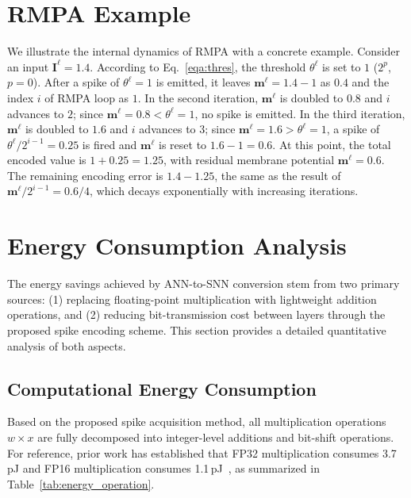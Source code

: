 \section{RMPA Example}\label{sec:rmpa_example}
We illustrate the internal dynamics of RMPA with a concrete example. Consider an input $\mathbf{I}^\ell = 1.4$. According to Eq.~\eqref{eqa:thres}, the threshold $\theta^\ell$ is set to $1$ ($2^{p}$, $p=0$). After a spike of $\theta^\ell=1$ is emitted, it leaves $\mathbf{m}^\ell=1.4-1$ as $0.4$ and the index $i$ of RMPA loop as $1$. In the second iteration, $\mathbf{m}^\ell$ is doubled to $0.8$ and $i$ advances to $2$; since $\mathbf{m}^\ell = 0.8 < \theta^\ell=1$, no spike is emitted. In the third iteration, $\mathbf{m}^\ell$ is doubled to $1.6$ and $i$ advances to $3$; since $\mathbf{m}^\ell = 1.6 > \theta^\ell=1$, a spike of $\theta^\ell / 2^{i-1}= 0.25$ is fired and $\mathbf{m}^\ell$ is reset to $1.6 - 1 = 0.6$. At this point, the total encoded value is $1 + 0.25 = 1.25$, with residual membrane potential $\mathbf{m}^\ell = 0.6$. The remaining encoding error is $1.4 - 1.25$, the same as the result of $\mathbf{m}^\ell / 2^{i-1} = 0.6 / 4$, which decays exponentially with increasing iterations.


\section{Energy Consumption Analysis\label{sec:energy}}

The energy savings achieved by ANN-to-SNN conversion stem from two primary sources: (1) replacing floating-point multiplication with lightweight addition operations, and (2) reducing bit-transmission cost between layers through the proposed spike encoding scheme. This section provides a detailed quantitative analysis of both aspects.

\subsection{Computational Energy Consumption}

Based on the proposed spike acquisition method, all multiplication operations $w \times x$ are fully decomposed into integer-level additions and bit-shift operations. For reference, prior work has established that FP32 multiplication consumes 3.7\,pJ and FP16 multiplication consumes 1.1\,pJ~\cite{energy}, as summarized in Table~\ref{tab:energy_operation}.

